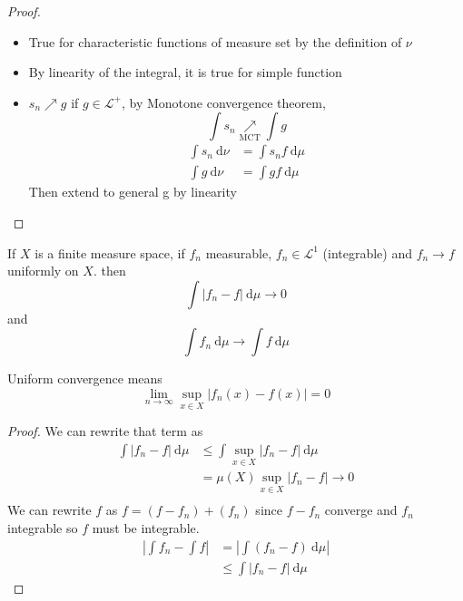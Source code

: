 \begin{proof}
  \begin{itemize}
    \item True for characteristic functions of measure set by the definition of $\nu$  
    \item By linearity of the integral, it is true for simple function
    \item  $s_n\nearrow g$ if $g \in \mathcal{L}^+$, by Monotone convergence theorem, 
    \[\int s_n \underset{\text{MCT}}\nearrow \int g\]
    \begin{align*}
      \int s_n \ \mathrm{d}\nu &= \int s_n f \ \mathrm{d}\mu \\
      \int g \ \mathrm{d}\nu &= \int g f \ \mathrm{d}\mu
    \end{align*}
    Then extend to general g by linearity
  \end{itemize}
\end{proof}


\begin{theorem}
  If $X$ is a finite measure space, if $f_n$ measurable, $f_n \in \mathcal{L}^1$ (integrable) and $f_n \to f$ uniformly on $X$. 
  then $$\int |f_n - f| \ \mathrm{d}\mu \to 0$$
  and 
  $$\int f_n\ \mathrm{d}\mu \to \int f\ \mathrm{d}\mu$$
\end{theorem}
  
\begin{remark}
  Uniform convergence means
  \[\lim_{n \to \infty}\sup_{x \in X} |f_n(x) - f(x)| = 0\]
\end{remark}

\begin{proof}
  We can rewrite that term as 
  \begin{align*}
    \int |f_n - f| \ \mathrm{d}\mu &\le \int \sup_{x\in X} |f_n - f|\ \mathrm{d}\mu \\ 
    &= \mu(X) \sup_{x\in X} |f_n - f| \to 0\\
  \end{align*}
  We can rewrite $f$ as $f = (f - f_n) + (f_n)$ since $f-f_n$ converge and $f_n$ integrable so $f$ must be integrable.
  \begin{align*}
    \left|\int f_n - \int f\right| &= \left|\int (f_n - f)\ \mathrm{d}\mu\right| \\
    &\le \int |f_n - f|\ \mathrm{d}\mu 
  \end{align*}
\end{proof}


